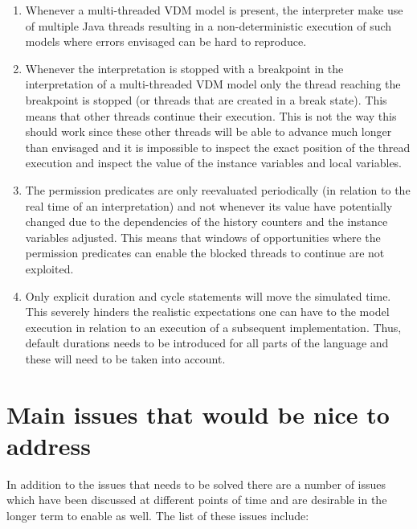 \documentclass{overturerep}
\begin{document}
\begin{enumerate}
\item Whenever a multi-threaded VDM model is present, the interpreter
  make use of multiple Java threads resulting in a
  non-deterministic execution of such models where errors envisaged
  can be hard to reproduce.
\item Whenever the interpretation is stopped with a breakpoint in the
  interpretation of a multi-threaded VDM model only the thread reaching
  the breakpoint is stopped (or threads that are created in a break
  state). This means that other threads continue their execution. This
  is not the way this should work since these other
  threads will be able to advance much longer than envisaged and it is
  impossible to inspect the exact position of the thread execution and
  inspect the value of the instance variables and local variables.
\item The permission predicates are only reevaluated periodically (in
  relation to the real time of an interpretation) and not whenever its
  value have potentially changed due to the dependencies of the
  history counters and the instance variables adjusted. This means
  that windows of opportunities where the permission predicates can
  enable the blocked threads to continue are not exploited.
\item Only explicit duration and cycle statements will move the
  simulated time. This severely hinders the realistic expectations one
  can have to the model execution in relation to an execution of a
  subsequent implementation. Thus, default durations needs to be
  introduced for all parts of the language and these will need to be
  taken into account.
\end{enumerate}

\section{Main issues that would be nice to address}

In addition to the issues that needs to be solved there are a number of
issues which have been discussed at different points of time and are
desirable in the longer term to enable as well. The list of these
issues include:
\end{document}
